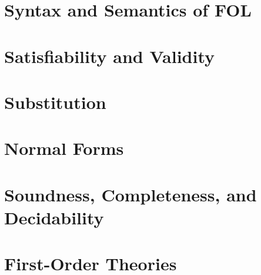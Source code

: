 
\section{Syntax and Semantics of FOL}

\section{Satisfiability and Validity}

\section{Substitution}

\section{Normal Forms}

\section{Soundness, Completeness, and Decidability}

\section{First-Order Theories}